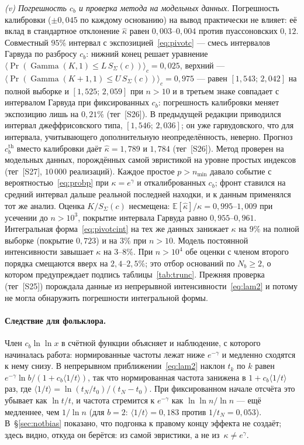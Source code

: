 \documentclass[11pt,a4paper]{article}
\theoremstyle{plain}
\theoremstyle{remark}
\newcommand{\eg}{e^{\gamma}}
\newcommand{\emg}{e^{-\gamma}}
\DeclareMathOperator{\Gam}{Gamma}
\begin{document}
\emph{(v) Погрешность $c_b$ и проверка метода на модельных данных.} Погрешность
калибровки ($\pm0{,}045$ по каждому основанию) на вывод практически не влияет:
её вклад в стандартное отклонение $\hat\kappa$ равен $0{,}003$--$0{,}004$ против
пуассоновских $0{,}12$. Совместный $95\%$ интервал с экспозицией~\eqref{eq:pivotc}
--- смесь интервалов Гарвуда по разбросу $c_b$: нижний конец решает уравнение
$\langle\Pr(\Gam(K,1)\le L\,S_\Sigma(c))\rangle_c=0{,}025$, верхний ---
$\langle\Pr(\Gam(K+1,1)\le U\,S_\Sigma(c))\rangle_c=0{,}975$ --- равен
$[1{,}543;\,2{,}042]$ на полной выборке и $[1{,}525;\,2{,}059]$ при $n>10$ и в третьем
знаке совпадает с интервалом Гарвуда при фиксированных $c_b$: погрешность
калибровки меняет экспозицию лишь на $0{,}21\%$ (тег~[S26]). В предыдущей редакции
приводился интервал джеффрисовского типа, $[1{,}546;\,2{,}036]$; он уже гарвудовского,
что для интервала, учитывающего дополнительную неопределённость, неверно. Прогноз $c^{\mathrm{th}}_b$ вместо калибровки даёт
$\hat\kappa=1{,}789$ и $1{,}784$ (тег~[S26]). Метод проверен на модельных данных,
порождённых самой эвристикой на уровне простых индексов (тег~[S27], $10\,000$
реализаций). Каждое простое $p>n_{\min}$ давало событие с
вероятностью~\eqref{eq:probp} при $\kappa=\eg$ и откалиброванных $c_b$; фронт
ставился на средний интервал дальше реальной последней находки, и к данным
применялся тот же анализ. Оценка $K/S_\Sigma(c)$ несмещена:
$\mathbb E[\hat\kappa]/\kappa=0{,}995$--$1{,}009$ при усечении до $n>10^3$, покрытие
интервала Гарвуда равно $0{,}955$--$0{,}961$. Интегральная форма~\eqref{eq:pivotcint}
на тех же данных занижает $\kappa$ на $9\%$ на полной выборке (покрытие $0{,}723$) и
на $3\%$ при $n>10$. Модель постоянной интенсивности завышает $\kappa$ на
$3$--$8\%$. При $n>10^4$ обе оценки с членом второго порядка смещаются вверх на
$2{,}4$--$2{,}5\%$; это отбор оснований по $N_b\ge2$, о котором предупреждает подпись
таблицы~\ref{tab:trunc}. Прежняя проверка (тег~[S25]) порождала данные из
непрерывной интенсивности~\eqref{eq:lam2} и потому не могла обнаружить погрешности
интегральной формы.

\paragraph{Следствие для фольклора.} Член $c_b\ln\ln x$ в счётной функции объясняет
и наблюдение, с которого начиналась работа: нормированные частоты лежат ниже
$\emg$ и медленно сходятся к нему снизу. В непрерывном
приближении~\eqref{eq:lam2} наклон $t_k$ по $k$ равен $\emg\ln b/(1+c_b\langle1/t\rangle)$, так что нормированная частота
занижена в $1+c_b\langle1/t\rangle$ раз, где
$\langle1/t\rangle=\ln(t_N/t_0)/(t_N-t_0)$. При фиксированном начале отсчёта это
убывает как $\ln t/t$, и частота стремится к $\emg$ как $\ln\ln n/\ln n$ --- ещё
медленнее, чем $1/\ln n$ (для $b=2$: $\langle1/t\rangle=0{,}183$ против
$1/t_N=0{,}053$). В~\S\ref{sec:notbias} показано, что
подгонка к правому концу эффекта не создаёт; здесь видно, откуда он берётся:
из самой эвристики, а не из~$\kappa\ne\eg$.
\end{document}
